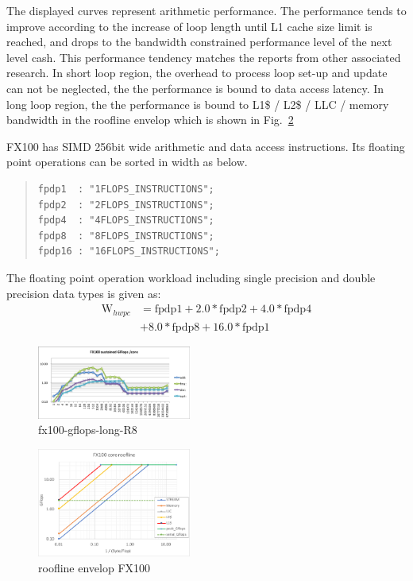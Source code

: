 \documentclass[conference]{IEEEtran}
\begin{document}
The displayed curves represent arithmetic performance.
The performance tends to improve according to the increase of
loop length until L1 cache size limit is reached, and drops to
the bandwidth constrained performance level of the next level cash.
This performance tendency matches the reports from other associated research.
In short loop region,
the overhead to process loop set-up and update can not be neglected,
the the performance is bound to data access latency.
In long loop region,
the the performance is bound to
L1\$ / L2\$ / LLC / memory bandwidth in the roofline \cite{Williams:2009}
envelop which is shown in Fig.~\ref{fig:roofline-fx100}

FX100 has SIMD 256bit wide arithmetic and data access instructions.
Its floating point operations can be sorted in width as below.
\begin{quote}
\begin{small}
\begin{verbatim}
fpdp1  : "1FLOPS_INSTRUCTIONS";
fpdp2  : "2FLOPS_INSTRUCTIONS";
fpdp4  : "4FLOPS_INSTRUCTIONS";
fpdp8  : "8FLOPS_INSTRUCTIONS";
fpdp16 : "16FLOPS_INSTRUCTIONS";
\end{verbatim}
\end{small}
\end{quote}
The floating point operation workload including single precision
and double precision data types is given as:
\begin{align}
	\mathrm{W}_{hwpc} & = \mathrm{fpdp1} + 2.0*\mathrm{fpdp2} + 4.0*\mathrm{fpdp4} \nonumber \\
			& + 8.0*\mathrm{fpdp8} + 16.0*\mathrm{fpdp1} 
\end{align}

\begin{figure}[tb]
\centering
\includegraphics[width=0.45\textwidth]{figs/fx100-gflops-long-R8.pdf}
\caption{fx100-gflops-long-R8}
\label{fig:fx100-gflops-long-R8}
\end{figure}

\begin{figure}[tb]
\includegraphics[width=0.45\textwidth]{figs/roofline-fx100.pdf}
\caption{roofline envelop FX100}
\label{fig:roofline-fx100}
\end{figure}
\end{document}
